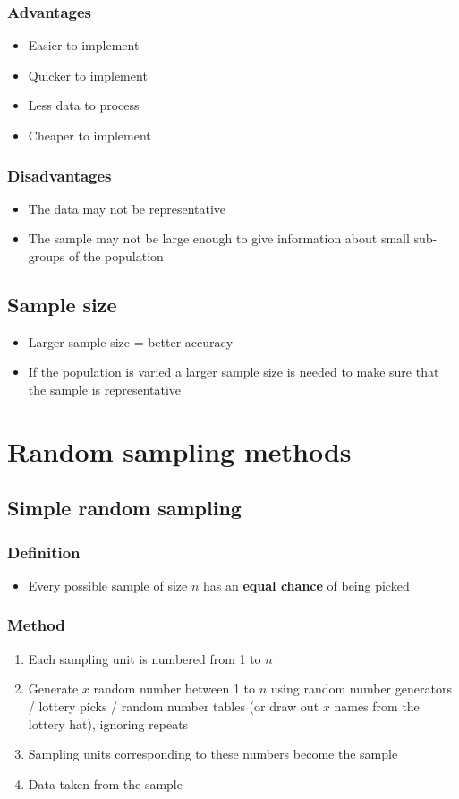 \subsubsection{Advantages}
\begin{itemize}
	\item Easier to implement
	\item Quicker to implement
	\item Less data to process
	\item Cheaper to implement
\end{itemize}
\subsubsection{Disadvantages}
\begin{itemize}
	\item The data may not be representative
	\item The sample may not be large enough to give information about small sub-groups of the population
\end{itemize}
\subsection{Sample size}
\begin{itemize}
	\item Larger sample size = better accuracy
	\item If the population is varied a larger sample size is needed to make sure that the sample is representative
\end{itemize}


\section{Random sampling methods}
\subsection{Simple random sampling}
\subsubsection{Definition}
\begin{itemize}
	\item Every possible sample of size $n$ has an \textbf{equal chance} of being picked
\end{itemize}
\subsubsection{Method}
\begin{enumerate}
	\item Each sampling unit is numbered from 1 to $n$
	\item Generate $x$ random number between 1 to $n$ using random number generators / lottery picks / random number tables (or draw out $x$ names from the lottery hat), ignoring repeats
	\item Sampling units corresponding to these numbers become the sample
	\item Data taken from the sample
\end{enumerate}
